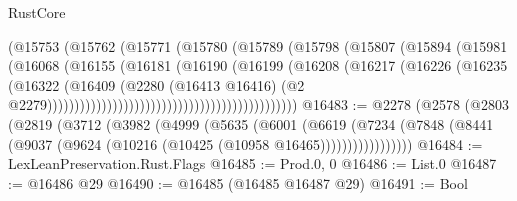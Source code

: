 \begin{lexlean}{RustCore}
\begin{coremodule}
                                                    (@15753
                                                      (@15762
                                                        (@15771
                                                          (@15780
                                                            (@15789
                                                              (@15798
                                                                (@15807
                                                                  (@15894
                                                                    (@15981
                                                                      (@16068
                                                                        (@16155
                                                                          (@16181
                                                                            (@16190
                                                                              (@16199
                                                                                (@16208
                                                                                  (@16217
                                                                                    (@16226
                                                                                      (@16235
                                                                                        (@16322
                                                                                          (@16409
                                                                                            (@2280
                                                                                              (@16413
                                                                                                @16416)
                                                                                              (@2
                                                                                                @2279))))))))))))))))))))))))))))))))))))))))))))))
@16483 := @2278
    (@2578
      (@2803
        (@2819
          (@3712
            (@3982
              (@4999
                (@5635
                  (@6001
                    (@6619
                      (@7234
                        (@7848 (@8441 (@9037 (@9624 (@10216 (@10425 (@10958 @16465)))))))))))))))))
@16484 := LexLeanPreservation.Rust.Flags
@16485 := Prod.{0, 0}
@16486 := List.{0}
@16487 := @16486 @29
@16490 := @16485 (@16485 @16487 @29)
@16491 := Bool

\end{coremodule}
\end{lexlean}
